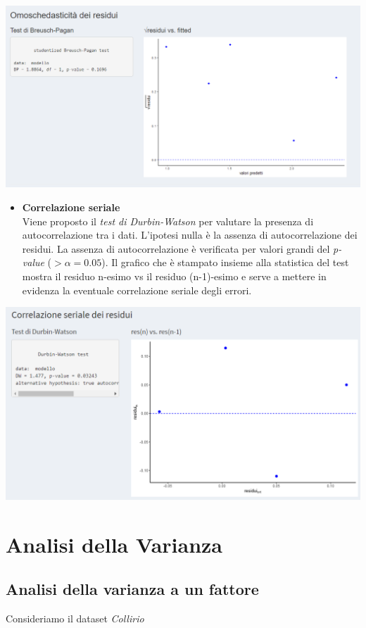 \documentclass[
  11pt,
]{book}
\providecommand{\tightlist}{%
  \setlength{\itemsep}{0pt}\setlength{\parskip}{0pt}}
\begin{document}
\begin{center}\includegraphics[width=0.5\linewidth]{Immagini/Regressione/14_ipotesi3} \end{center}

\begin{itemize}
\tightlist
\item
  \textbf{Correlazione seriale}\\
  Viene proposto il \emph{test di Durbin-Watson} per valutare la presenza di autocorrelazione tra i dati. L'ipotesi nulla è la assenza di autocorrelazione dei residui. La assenza di autocorrelazione è verificata per valori grandi del \emph{p-value} (\(> \alpha = 0.05\)). Il grafico che è stampato insieme alla statistica del test mostra il residuo n-esimo vs il residuo (n-1)-esimo e serve a mettere in evidenza la eventuale correlazione seriale degli errori.
\end{itemize}

\begin{center}\includegraphics[width=0.5\linewidth]{Immagini/Regressione/15_ipotesi4} \end{center}

\hypertarget{analisi-della-varianza}{%
\chapter{Analisi della Varianza}\label{analisi-della-varianza}}

\hypertarget{analisi-della-varianza-a-un-fattore}{%
\section{Analisi della varianza a un fattore}\label{analisi-della-varianza-a-un-fattore}}

Consideriamo il dataset \emph{Collirio}
\end{document}
